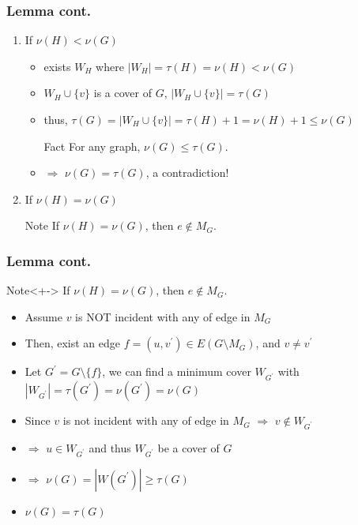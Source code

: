 \documentclass{beamer}
\begin{document}
\begin{frame}
  \frametitle{Lemma cont.}
  \begin{enumerate}[<+->]
  \item If $\nu{(H)}<\nu{(G)}$
    \begin{itemize}
    \item exists $W_H$ where $|W_H|=\tau{(H)}=\nu{(H)}<\nu{(G)}$
    \item $W_H\cup{\{v\}}$ is a cover of $G$, $|W_H\cup{\{v\}}|=\tau{(G)}$
    \item thus, $\tau{(G)}=|W_H\cup{\{v\}}|=\tau{(H)}+1=\nu{(H)}+1\leq{\nu{(G)}}$
      \begin{block}{Fact}
      For any graph, $\nu{(G)}\leq{\tau{(G)}}$.
      \end{block}
    \item $\Rightarrow$ $\nu{(G)}=\tau{(G)}$, a contradiction!
    \end{itemize}
  \item If $\nu{(H)}=\nu{(G)}$
    \begin{exampleblock}{Note}
    If $\nu{(H)}=\nu{(G)}$, then $e\notin{M_G}$.
    \end{exampleblock}
  \end{enumerate}
\end{frame}

\begin{frame}
  \frametitle{Lemma cont.}
  \begin{exampleblock}{Note}<+->
  If $\nu{(H)}=\nu{(G)}$, then $e\notin{M_G}$.
  \end{exampleblock}
  \begin{itemize}[<+->]
  \item Assume $v$ is \alert{NOT} incident with any of edge in $M_G$
  \item Then, exist an edge $f=(u,v^{'})\in{E(G\setminus{M_G})}$, and $v\neq{v^{'}}$ 
  \item Let $G^{'}=G\setminus{\{f\}}$, we can find a minimum cover $W_{G^{'}}$ with $|W_{G^{'}}|=\tau{(G^{'})}=\nu{(G^{'})}=\nu{(G)}$
  \item Since $v$ is not incident with any of edge in $M_G$ $\Rightarrow$ $v\notin{W_{G^{'}}}$
  \item $\Rightarrow$ $u\in{W_{G^{'}}}$ and thus $W_{G^{'}}$ be a cover of $G$
  \item $\Rightarrow$ $\nu{(G)}=|W(G^{'})|\geq{\tau{(G)}}$
  \item $\nu{(G)}=\tau{(G)}$
  \end{itemize}
\end{frame}
\end{document}

